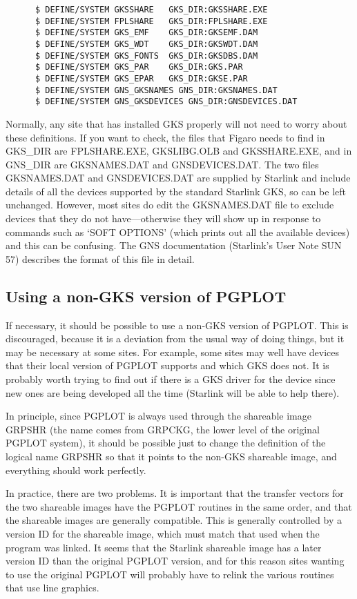 \begin{verbatim}
      $ DEFINE/SYSTEM GKSSHARE   GKS_DIR:GKSSHARE.EXE
      $ DEFINE/SYSTEM FPLSHARE   GKS_DIR:FPLSHARE.EXE
      $ DEFINE/SYSTEM GKS_EMF    GKS_DIR:GKSEMF.DAM
      $ DEFINE/SYSTEM GKS_WDT    GKS_DIR:GKSWDT.DAM
      $ DEFINE/SYSTEM GKS_FONTS  GKS_DIR:GKSDBS.DAM
      $ DEFINE/SYSTEM GKS_PAR    GKS_DIR:GKS.PAR
      $ DEFINE/SYSTEM GKS_EPAR   GKS_DIR:GKSE.PAR
      $ DEFINE/SYSTEM GNS_GKSNAMES GNS_DIR:GKSNAMES.DAT
      $ DEFINE/SYSTEM GNS_GKSDEVICES GNS_DIR:GNSDEVICES.DAT
\end{verbatim}

Normally, any site that has installed GKS properly will not need to worry 
about these definitions. If you want to check, the files that Figaro needs to
find in GKS\_DIR are FPLSHARE.EXE, GKSLIBG.OLB and GKSSHARE.EXE, and in
GNS\_DIR are GKSNAMES.DAT and GNSDEVICES.DAT. The two files GKSNAMES.DAT and
GNSDEVICES.DAT are supplied by Starlink and include details of all the devices
supported by the standard Starlink GKS, so can be left unchanged.  However, 
most sites do edit the GKSNAMES.DAT file to exclude devices that they do not
have---otherwise they will show up in response to commands such as  `SOFT
OPTIONS' (which prints out all the available devices) and this  can be
confusing. The GNS documentation (Starlink's User Note SUN 57) describes the
format of this file in detail.

\subsection{Using a non-GKS version of PGPLOT}

If necessary, it should be possible to use a non-GKS version of PGPLOT. This is
discouraged, because it is a deviation from the usual way of doing things, but
it may be necessary at some sites.  For example, some sites may well have
devices that their local version of PGPLOT supports and which GKS does not. It
is probably worth trying to find out if there is a GKS driver for the device
since new ones are being developed all the time (Starlink will be able to help
there).

In principle, since PGPLOT is always used through the shareable image GRPSHR 
(the name comes from GRPCKG, the lower level of the original PGPLOT system), it
should be possible just to change the definition of the logical name GRPSHR so
that it points to the non-GKS shareable image, and everything should work
perfectly.

In practice, there are two problems. It is important that the transfer vectors
for the two shareable images have the PGPLOT routines in the same  order, and
that the shareable images are generally compatible.  This  is generally
controlled by a version ID for the shareable image, which must match that used
when the program was linked. It seems that the  Starlink shareable image has a
later version ID than the original PGPLOT version, and for this reason sites
wanting to use the original PGPLOT will probably have to relink the various
routines that use line graphics.

